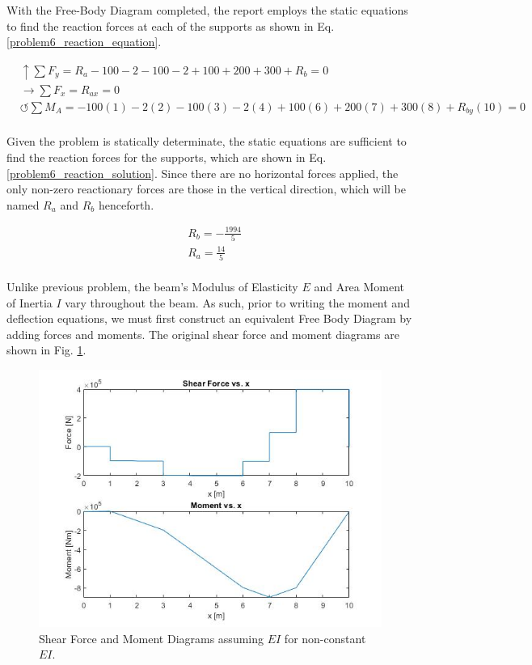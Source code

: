 \documentclass[a4paper]{article}
\begin{document}
With the Free-Body Diagram completed, the report employs the static equations to find the reaction forces at each of the supports as shown in Eq. \ref{problem6_reaction_equation}.

\begin{equation}
\begin{split}
	&\uparrow \sum F_y = R_a - 100 - 2 - 100 -2 + 100 + 200 + 300 + R_b = 0 \\
 	&\rightarrow \sum F_x = R_{ax} = 0 \\
 	&\circlearrowleft \sum M_A = -100(1) - 2(2) -100(3) - 2(4) +100(6) + 200(7) + 300(8) + R_{by}(10) = 0 \\
\end{split}
\label{problem6_reaction_equation}
\end{equation}

Given the problem is statically determinate, the static equations are sufficient to find the reaction forces for the supports, which are shown in Eq. \ref{problem6_reaction_solution}. Since there are no horizontal forces applied, the only non-zero reactionary forces are those in the vertical direction, which will be named $R_a$ and $R_b$ henceforth.

\begin{equation}
\begin{split}
	& R_b = -\frac{1994}{5} \\
	& R_a = \frac{14}{5} \\
\end{split}
\label{problem6_reaction_solution}
\end{equation}

Unlike previous problem, the beam's Modulus of Elasticity $E$ and Area Moment of Inertia $I$ vary throughout the beam. As such, prior to writing the moment and deflection equations, we must first construct an equivalent Free Body Diagram by adding forces and moments. The original shear force and moment diagrams are shown in Fig. \ref{noneq6}.

\begin{figure}[h]
\includegraphics[width=\textwidth]{results/noneq6.jpg}
\caption{Shear Force and Moment Diagrams assuming $EI$ for non-constant $EI$.}
\label{noneq6}
\end{figure}
\end{document}
